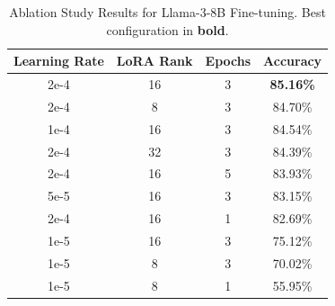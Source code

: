 \begin{table}[t]
\centering
\caption{Ablation Study Results for Llama-3-8B Fine-tuning. Best configuration in \textbf{bold}.}
\label{tab:ablation}
\small
\begin{tabular}{cccc}
\toprule
\textbf{Learning Rate} & \textbf{LoRA Rank} & \textbf{Epochs} & \textbf{Accuracy} \\
\midrule
2e-4 & 16 & 3 & \textbf{85.16\%} \\
2e-4 & 8 & 3 & 84.70\% \\
1e-4 & 16 & 3 & 84.54\% \\
2e-4 & 32 & 3 & 84.39\% \\
2e-4 & 16 & 5 & 83.93\% \\
5e-5 & 16 & 3 & 83.15\% \\
2e-4 & 16 & 1 & 82.69\% \\
1e-5 & 16 & 3 & 75.12\% \\
1e-5 & 8 & 3 & 70.02\% \\
1e-5 & 8 & 1 & 55.95\% \\
\bottomrule
\end{tabular}
\end{table}
